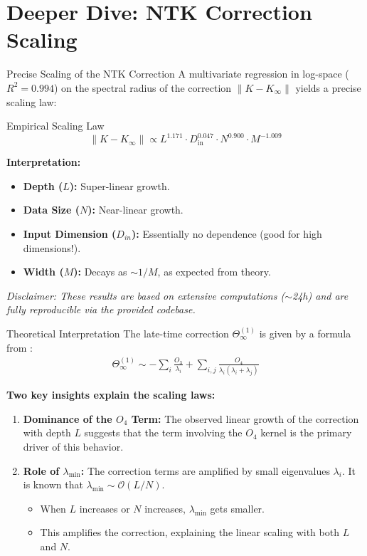 \documentclass{beamer}
\begin{document}
\section{Deeper Dive: NTK Correction Scaling}

\begin{frame}{Precise Scaling of the NTK Correction}
A multivariate regression in log-space ($R^2=0.994$) on the spectral radius of the correction $\|K - K_\infty\|$ yields a precise scaling law:

\begin{alertblock}{Empirical Scaling Law}
\[
\|K - K_\infty\| \propto L^{1.171} \cdot D_{\text{in}}^{0.047} \cdot N^{0.900} \cdot M^{-1.009}
\]
\end{alertblock}

\textbf{Interpretation:}
\begin{itemize}
    \item \textbf{Depth ($L$):} Super-linear growth.
    \item \textbf{Data Size ($N$):} Near-linear growth.
    \item \textbf{Input Dimension ($D_{in}$):} Essentially no dependence (good for high dimensions!).
    \item \textbf{Width ($M$):} Decays as $\sim 1/M$, as expected from theory.
\end{itemize}

\vfill
\tiny{\textit{Disclaimer: These results are based on extensive computations ($\sim$24h) and are fully reproducible via the provided codebase.}}

\end{frame}

\begin{frame}{Theoretical Interpretation}
The late-time correction $\Theta^{(1)}_\infty$ is given by a formula from \cite{large-width-feynman}:
\begin{align*}
\Theta^{(1)}_\infty \sim -\sum_{i}\frac{O_{3}}{\lambda_{i}} + \sum_{i,j}\frac{O_{4}}{\lambda_{i}(\lambda_{i}+\lambda_{j})}
\end{align*}

\textbf{Two key insights explain the scaling laws:}
\begin{enumerate}
    \item \textbf{Dominance of the $O_4$ Term:} The observed linear growth of the correction with depth $L$ suggests that the term involving the $O_4$ kernel is the primary driver of this behavior.
    \item \textbf{Role of $\lambda_{\min}$:} The correction terms are amplified by small eigenvalues $\lambda_i$. It is known that $\lambda_{\min} \sim \mathcal{O}(L/N)$.
    \begin{itemize}
        \item When $L$ increases or $N$ increases, $\lambda_{\min}$ gets smaller.
        \item This amplifies the correction, explaining the linear scaling with both $L$ and $N$.
    \end{itemize}
\end{enumerate}
\end{frame}
\end{document}
